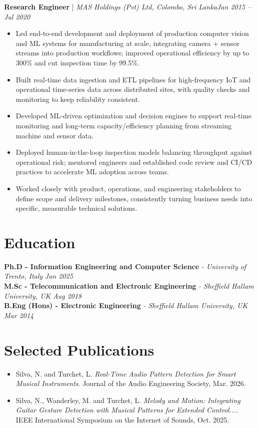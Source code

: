 \documentclass[11pt]{article}
\newenvironment{cvrole}[5]{%
  \par\noindent\textbf{\large #1} | \textit{\small #2, #3}\hfill \textit{\small #4 -- #5}\par
  \begin{itemize}[leftmargin=2em, itemsep=-0.3em, topsep=-0.5em]%
}{%
  \end{itemize}\par\noindent\mbox{}\par\vspace{0.1em}%
}
\begin{document}
\begin{cvrole}{Research Engineer}{MAS Holdings (Pvt) Ltd}{Colombo, Sri Lanka}{Jan 2015}{Jul 2020}
    \item Led end-to-end development and deployment of production computer vision and ML systems for manufacturing at scale, integrating camera + sensor streams into production workflows; improved operational efficiency by up to 300\% and cut inspection time by 99.5\%.
    \item Built real-time data ingestion and ETL pipelines for high-frequency IoT and operational time-series data across distributed sites, with quality checks and monitoring to keep reliability consistent.
    \item Developed ML-driven optimization and decision engines to support real-time monitoring and long-term capacity/efficiency planning from streaming machine and sensor data.
    \item Deployed human-in-the-loop inspection models balancing throughput against operational risk; mentored engineers and established code review and CI/CD practices to accelerate ML adoption across teams.
    \item Worked closely with product, operations, and engineering stakeholders to define scope and delivery milestones, consistently turning business needs into specific, measurable technical solutions.
\end{cvrole}

\section*{Education}
\noindent\textbf{Ph.D - Information Engineering and Computer Science} \textit{\small{ - University of Trento, Italy}} \hfill \textit{Jan 2025}\\[2pt]
\noindent\textbf{M.Sc - Telecommunication and Electronic Engineering} \textit{\small{ - Sheffield Hallam University, UK}} \hfill \textit{Aug 2018}\\[2pt]
\noindent\textbf{B.Eng (Hons) - Electronic Engineering} \textit{\small{ - Sheffield Hallam University, UK}} \hfill \textit{Mar 2014}

\section*{Selected Publications \footnotesize {}}
\begin{itemize}[leftmargin=1.2em, itemsep=-0.25em]
    \item Silva, N. and Turchet, L. \textit{Real-Time Audio Pattern Detection for Smart Musical Instruments}. Journal of the Audio Engineering Society, Mar. 2026.
    \item Silva, N., Wanderley, M. and Turchet, L. \textit{Melody and Motion: Integrating Guitar Gesture Detection with Musical Patterns for Extended Control....} IEEE International Symposium on the Internet of Sounds, Oct. 2025.
\end{itemize}
\end{document}

